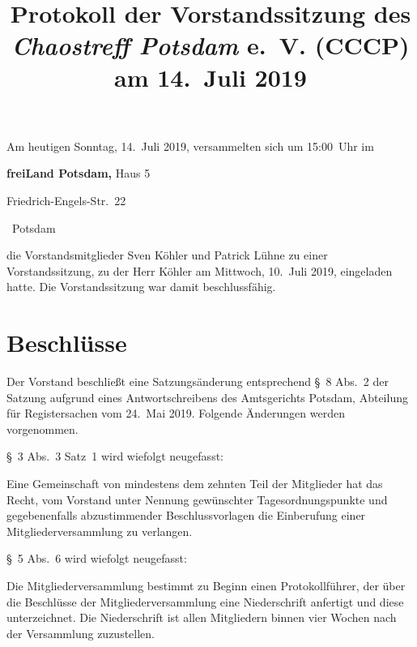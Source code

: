 \documentclass[a4paper, 10pt, headings=normal]{scrartcl}
\title{Protokoll der Vorstandssitzung des \\ \emph{Chaostreff Potsdam} e.~V. (CCCP) \\ am 14.~Juli 2019}
\author{}
\date{}
\begin{document}
\maketitle
\pagestyle{myheadings}


\thispagestyle{empty}

\noindent Am heutigen Sonntag, 14.~Juli 2019, versammelten sich um 15:00~Uhr im
\begin{address}\strut%
	\textbf{freiLand Potsdam,} Haus 5

	\noindent Friedrich-Engels-Str.~22

	~Potsdam
\end{address}
die Vorstandsmitglieder Sven Köhler und Patrick Lühne zu einer Vorstandssitzung, zu der Herr Köhler am Mittwoch, 10.~Juli 2019, eingeladen hatte.
Die Vorstandssitzung war damit beschlussfähig.

\section*{Beschlüsse}

Der Vorstand beschließt eine Satzungsänderung entsprechend §~8 Abs.~2 der Satzung aufgrund eines Antwortschreibens des Amtsgerichts Potsdam, Abteilung für Registersachen vom 24.~Mai 2019.
Folgende Änderungen werden vorgenommen.

§~3 Abs.~3 Satz~1 wird wiefolgt neugefasst:
\begin{address}\strut%
	Eine Gemeinschaft von mindestens dem zehnten Teil der Mitglieder hat das Recht, vom Vorstand unter Nennung gewünschter Tagesordnungspunkte und gegebenenfalls abzustimmender Beschlussvorlagen die Einberufung einer Mitgliederversammlung zu verlangen.
\end{address}

§~5 Abs.~6 wird wiefolgt neugefasst:
\begin{address}\strut%
	Die Mitgliederversammlung bestimmt zu Beginn einen Protokollführer, der über die Beschlüsse der Mitgliederversammlung eine Niederschrift anfertigt und diese unterzeichnet.
	Die Niederschrift ist allen Mitgliedern binnen vier Wochen nach der Versammlung zuzustellen.
\end{address}
\end{document}
